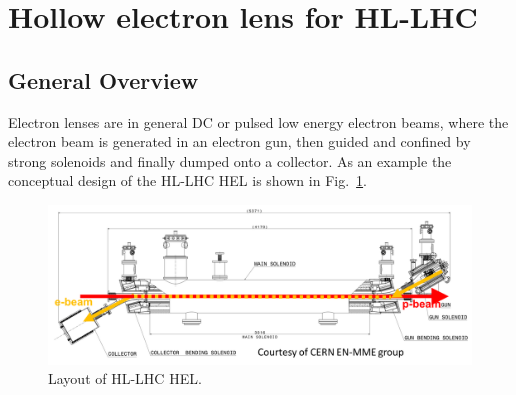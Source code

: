 \documentclass[%
 reprint,
 amsmath,amssymb,
 aps,
prstab,
]{revtex4-1}
\begin{document}
\section{Hollow electron lens for HL-LHC\label{sec:hel}}
\subsection{General Overview\label{sec:hel:intro}}
Electron lenses are in general DC or pulsed low energy electron beams, where the electron beam is generated in an electron gun, then guided and confined by strong solenoids and finally dumped onto a collector. As an example the conceptual design of the HL-LHC HEL is shown in Fig.~\ref{fig:hel_layout}.
\begin{figure}[h]
	\includegraphics[width=1.0\linewidth]{hel_layout_epbeam}%
	\caption{\label{fig:hel_layout} Layout of HL-LHC HEL.}
\end{figure}
\end{document}
